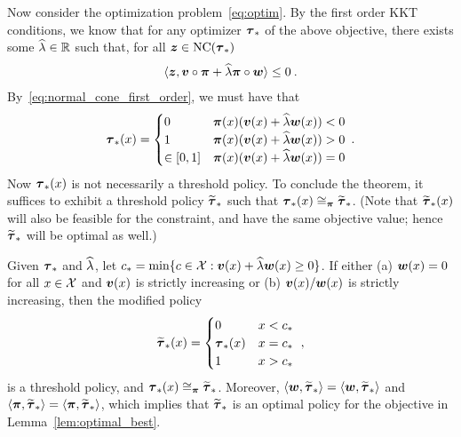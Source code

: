 	Now consider the optimization problem~\eqref{eq:optim}. By the first order KKT conditions, we know that for any optimizer $\boldsymbol{\tau}_*$ of the above objective, there exists some $\widehat{\lambda} \in \mathbb{R}$ such that, for all $\boldsymbol{z} \in \mathrm{NC}(\boldsymbol{\tau}_*)$
	\begin{eqnarray*}
	\langle \boldsymbol{z}, \boldsymbol{v} \circ \boldsymbol{\pi} + \widehat{\lambda} \boldsymbol{\pi} \circ \boldsymbol{w} \rangle \le 0\:.
	\end{eqnarray*}
	By~\eqref{eq:normal_cone_first_order}, we must have that
	\begin{eqnarray*}
	\boldsymbol{\tau}_*(x) = \begin{cases} 0 & \boldsymbol{\pi}(x)(\boldsymbol{v}(x) + \widehat{\lambda}\boldsymbol{w}(x))< 0\\
	1 & \boldsymbol{\pi}(x)(\boldsymbol{v}(x) + \widehat{\lambda}\boldsymbol{w}(x)) > 0\\
	 \in [0,1] & \boldsymbol{\pi}(x)(\boldsymbol{v}(x) + \widehat{\lambda}\boldsymbol{w}(x)) = 0
	\end{cases}\:.
	\end{eqnarray*}
	Now $\boldsymbol{\tau}_*(x)$ is not necessarily a threshold policy. To conclude the theorem, it suffices to exhibit a threshold policy $\widetilde{\boldsymbol{\tau}}_*$ such that $\boldsymbol{\tau}_*(x) \cong_{\boldsymbol{\pi}} \widetilde{\boldsymbol{\tau}}_*$. (Note that $\widetilde{\boldsymbol{\tau}}_*(x)$ will also be feasible for the constraint, and have the same objective value; hence $\widetilde{\boldsymbol{\tau}}_*$ will be optimal as well.)


	Given $\boldsymbol{\tau}_*$ and $\widehat{\lambda}$, let $c_* = \min\{ c \in \mathcal{X}: \boldsymbol{v}(x) + \widehat{\lambda}\boldsymbol{w}(x) \ge 0\}$. If either (a) $\boldsymbol{w}(x) = 0$ for all $x \in \mathcal{X}$ and $\boldsymbol{v}(x)$ is strictly increasing or (b) $\boldsymbol{v}(x)/\boldsymbol{w}(x)$ is strictly increasing, then the modified policy 
	\begin{eqnarray*}
	\widetilde{\boldsymbol{\tau}}_*(x) = \begin{cases} 0 & x < c_*\\
	\boldsymbol{\tau}_*(x) & x = c_* \\
	1 & x > c_*
	\end{cases}~,
	\end{eqnarray*}
	is a threshold policy, and $\boldsymbol{\tau}_*(x) \cong_{\boldsymbol{\pi}} \widetilde{\boldsymbol{\tau}}_*$. Moreover, $\langle \boldsymbol{w},\widetilde{\boldsymbol{\tau}}_* \rangle = \langle \boldsymbol{w},\widetilde{\boldsymbol{\tau}}_* \rangle$ and $\langle \boldsymbol{\pi},\widetilde{\boldsymbol{\tau}}_* \rangle = \langle \boldsymbol{\pi},\widetilde{\boldsymbol{\tau}}_* \rangle$, which implies that $\widetilde{\boldsymbol{\tau}}_*$ is an optimal policy for the objective in Lemma~\ref{lem:optimal_best}. 


